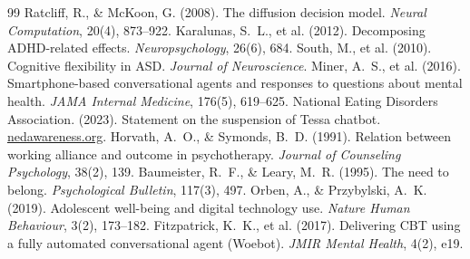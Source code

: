 \documentclass[10pt]{article}
\begin{document}
\begin{thebibliography}{99}\small\setlength\itemsep{1pt}
 Ratcliff, R., \& McKoon, G. (2008). The diffusion decision model. \textit{Neural Computation}, 20(4), 873--922.
 Karalunas, S.~L., et al. (2012). Decomposing ADHD-related effects. \textit{Neuropsychology}, 26(6), 684.
 South, M., et al. (2010). Cognitive flexibility in ASD. \textit{Journal of Neuroscience}.
 Miner, A.~S., et al. (2016). Smartphone-based conversational agents and responses to questions about mental health. \textit{JAMA Internal Medicine}, 176(5), 619--625.
 National Eating Disorders Association. (2023). Statement on the suspension of Tessa chatbot. \url{nedawareness.org}.
 Horvath, A.~O., \& Symonds, B.~D. (1991). Relation between working alliance and outcome in psychotherapy. \textit{Journal of Counseling Psychology}, 38(2), 139.
 Baumeister, R.~F., \& Leary, M.~R. (1995). The need to belong. \textit{Psychological Bulletin}, 117(3), 497.
 Orben, A., \& Przybylski, A.~K. (2019). Adolescent well-being and digital technology use. \textit{Nature Human Behaviour}, 3(2), 173--182.
 Fitzpatrick, K.~K., et al. (2017). Delivering CBT using a fully automated conversational agent (Woebot). \textit{JMIR Mental Health}, 4(2), e19.
\end{thebibliography}
\end{document}
